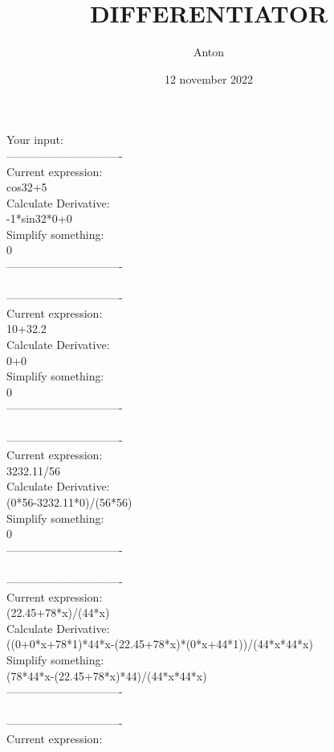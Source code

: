 \documentclass[12pt]{article}
\title{DIFFERENTIATOR}
\author{Anton}
\date{12 november 2022}
\begin{document}
    \maketitle
    Your input: \\
    
-------------------------------\\
Current expression:\\
cos32+5\\
Calculate Derivative:\\
-1*sin32*0+0\\
Simplify something:\\
0\\
-------------------------------\\
\\
-------------------------------\\
Current expression:\\
10+32.2\\
Calculate Derivative:\\
0+0\\
Simplify something:\\
0\\
-------------------------------\\
\\
-------------------------------\\
Current expression:\\
3232.11/56\\
Calculate Derivative:\\
(0*56-3232.11*0)/(56*56)\\
Simplify something:\\
0\\
-------------------------------\\
\\
-------------------------------\\
Current expression:\\
(22.45+78*x)/(44*x)\\
Calculate Derivative:\\
((0+0*x+78*1)*44*x-(22.45+78*x)*(0*x+44*1))/(44*x*44*x)\\
Simplify something:\\
(78*44*x-(22.45+78*x)*44)/(44*x*44*x)\\
-------------------------------\\
\\
-------------------------------\\
Current expression:\\
\end{document}
